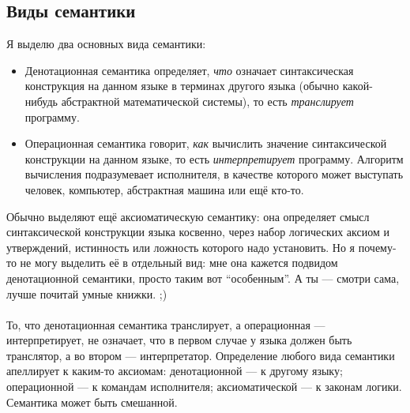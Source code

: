 \documentclass[11pt]{book}
\begin{document}
\subsection{Виды семантики}
Я выделю два основных вида семантики:
\begin{itemize}
\item Денотационная семантика определяет, \emph{что} означает синтаксическая конструкция на данном языке
в терминах другого языка (обычно какой-нибудь абстрактной математической системы),
то есть \emph{транслирует} программу.
\item Операционная семантика говорит, \emph{как} вычислить значение синтаксической конструкции на данном языке,
то есть \emph{интерпретирует} программу.
Алгоритм вычисления подразумевает исполнителя, в качестве которого может выступать человек, компьютер, абстрактная машина или ещё кто-то.
\end{itemize}
Обычно выделяют ещё аксиоматическую семантику: она определяет смысл синтаксической конструкции языка косвенно,
через набор логических аксиом и утверждений, истинность или ложность которого надо установить.
Но я почему-то не могу выделить её в отдельный вид: мне она кажется подвидом денотационной семантики,
просто таким вот ``особенным''.
А ты --- смотри сама, лучше почитай умные книжки. ;)
\\ \\
То, что денотационная семантика транслирует, а операционная --- интерпретирует,
не означает, что в первом случае у языка должен быть транслятор, а во втором --- интерпретатор.
Определение любого вида семантики апеллирует к каким-то аксиомам: денотационной --- к другому языку;
операционной --- к командам исполнителя; аксиоматической --- к законам логики.
Семантика может быть смешанной.
\end{document}
